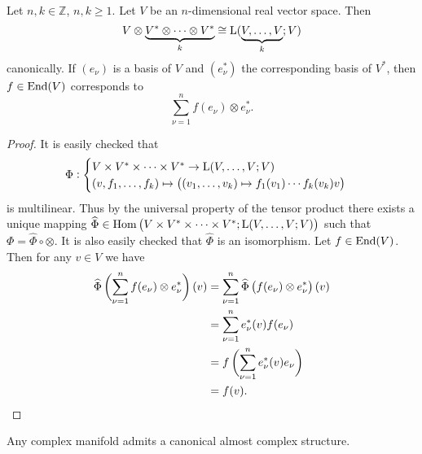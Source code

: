 \begin{lemma}
Let $n,k \in \mathbb{Z}$, $n,k \geq 1$. Let $V$ be an $n$-dimensional real vector space. Then
\begin{equation}
V \otimes \underbrace{V^* \otimes \dots \otimes V^*}_{k} \cong \mathrm{L}(\underbrace{V,\dots,V}_{k};V)
\end{equation}
\noindent canonically. If $(e_\nu)$ is a basis of $V$ and $(e_\nu^*)$ the corresponding basis of $V^*$, then $f \in \operatorname{End}(V)$ corresponds to
\begin{equation}
\sum_{\nu = 1}^n f(e_\nu) \otimes e_\nu^*.
\end{equation}
\label{lem:corr}
\end{lemma}

\begin{proof}
It is easily checked that
\begin{equation*}
\Phi:\begin{cases} 
V \times V^* \times \dots \times V^* \to \Lup(V,\dots,V;V)\\
(v,f_1,\dots,f_k) \mapsto \del[1]{(v_1,\dots,v_k) \mapsto f_1(v_1)\cdots f_k(v_k)v}
\end{cases}
\end{equation*}
\noindent is multilinear. Thus by the universal property of the tensor product there exists a unique mapping $\widehat{\Phi} \in \Hom\del[1]{V \times V^* \times \dots \times V^*; \Lup(V,\dots,V;V)}$ such that $\Phi = \widehat{\Phi} \circ \otimes$. It is also easily checked that $\widehat{\Phi}$ is an isomorphism. Let $f \in \operatorname{End}(V)$. Then for any $v \in V$ we have
\begin{align*}
\widehat{\Phi}\del[3]{\sum_{\nu = 1}^n f(e_\nu) \otimes e_\nu^*}(v) &= \sum_{\nu = 1}^n \widehat{\Phi}\del[1]{f(e_\nu) \otimes e_\nu^*}(v)\\
&= \sum_{\nu = 1}^n e_\nu^*(v)f(e_\nu)\\
&= f\del[3]{\sum_{\nu = 1}^n e_\nu^*(v)e_\nu}\\
&= f(v).
\end{align*}
\end{proof}

\begin{proposition}
Any complex manifold admits a canonical almost complex structure.
\label{prop:complex_is_almost}
\end{proposition}

